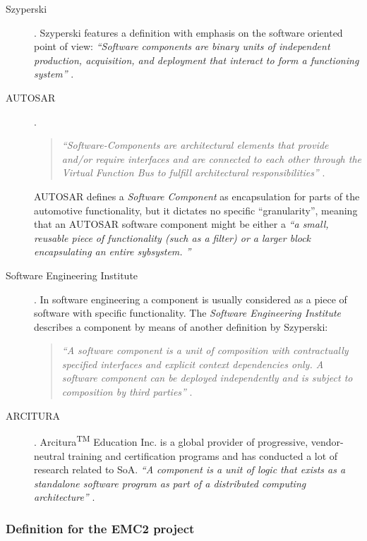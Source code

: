 \begin{description}
	\item [Szyperski].
	Szyperski features a definition with emphasis on the software oriented point of view: \emph{``Software components are binary units of independent production, acquisition, and deployment that interact to form a functioning system''} \cite[p.xxi]{szyperski}.

	\item [AUTOSAR].
	\begin{quote}
	\emph{``Software-Components are architectural elements that provide and/or require interfaces and are connected to each other through the Virtual Function Bus to fulfill architectural responsibilities''} \cite{autosar_glossary}.
	\end{quote}

	AUTOSAR defines a \emph{Software Component} as encapsulation for parts of the automotive functionality, but it dictates no specific ``granularity'', meaning that an AUTOSAR software component might be either a \emph{``a small, reusable piece of functionality (such as a filter) or a larger block encapsulating an entire sybsystem. \cite{autosar}''}
	
	\item [Software Engineering Institute].
	In software engineering a component is usually considered as a piece of software with specific functionality. The \emph{Software Engineering Institute} describes a component by means of another definition by Szyperski:
	\begin{quote}
	\emph{``A software component is a unit of composition with contractually specified interfaces and explicit context dependencies only. A software component can be deployed independently and is subject to composition by third parties''} \cite{szyperski}.
	\end{quote}

	\item [ARCITURA].
	Arcitura\textsuperscript{TM} Education Inc. is a global provider of progressive, vendor-neutral training and certification programs and has conducted a lot of research related to SoA.
	\emph{``A component is a unit of logic that exists as a standalone software program as part of a distributed computing architecture''} \cite{arcitura}.
 \end{description}


\subsubsection{Definition for the EMC2 project}


